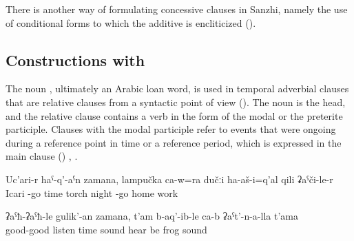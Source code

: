 There is another way of formulating concessive clauses in Sanzhi, namely the use of conditional forms to which the additive is encliticized ().



\subsection{Constructions with  }
\label{sec:constructions with zamana}

The noun  , ultimately an Arabic loan word, is used in temporal adverbial clauses that are relative clauses from a syntactic point of view (). The noun  is the head, and the relative clause contains a verb in the form of the modal or the preterite participle. Clauses with the modal participle refer to events that were ongoing during a reference point in time or a reference period, which is expressed in the main clause () , .
%
\begin{exe}
	\ex	\label{ex:‎While he came from Icari, he went with a torch at night home from work}
	\gll	Uc'ari-r	haˁ-q'-aˁn	zamana,	lampučka	ca-w=ra	dučːi	ha-aš-i=q'al	qili	ʡaˁči-le-r\\
		Icari	-go	time	torch		night	-go	home	work\\
	\glt	{}

	\ex	\label{ex:‎‎‎When he was attentively listening he heard the sound of frogs}
	\gll	ʡaˁħ-ʡaˁħ-le	gulik'-an	zamana,	t'am	b-aq'-ib-le	ca-b	ʡaˁt'-n-a-lla	t'ama\\
		good-good	listen	time	sound	hear	be	frog	sound\\
	\glt	{}
\end{exe}

